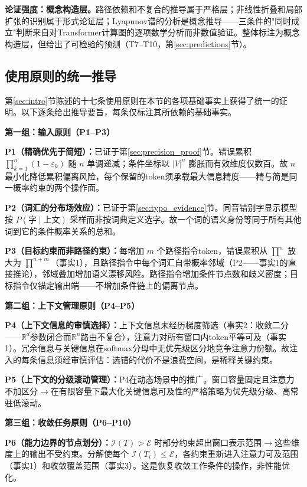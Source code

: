 \documentclass[11pt,a4paper]{article}
\theoremstyle{definition}
\newcommand{\effcap}{\mathcal{E}}
\begin{document}
\textbf{论证强度：概念构造层。}路径依赖和不复合的推导属于严格层；非线性折叠和局部扩张的识别属于形式论证层；Lyapunov谱的分析是概念推导——三条件的"同时成立"判断来自对Transformer计算图的逐项数学分析而非数值验证。整体标注为概念构造层，但给出了可检验的预测（T7--T10，第\ref{sec:predictions}节）。

\subsection{使用原则的统一推导}
\label{sec:principles_derivation}

第\ref{sec:intro}节陈述的十七条使用原则在本节的各项基础事实上获得了统一的证明。以下逐条给出推导要旨，每条仅标注其所依赖的基础事实。

\medskip
\textbf{第一组：输入原则（P1--P3）}

\textbf{P1（精确优先于简短）：}已证于第\ref{sec:precision_proof}节。错误累积 $\prod_{k=1}^n (1-\varepsilon_k)$ 随 $n$ 单调递减；条件坐标以 $|V|^n$ 膨胀而有效维度仅数百。故 $n$ 最小化降低累积偏离风险，每个保留的token须承载最大信息精度——精与简是同一概率约束的两个操作面。

\textbf{P2（词汇的分布场效应）：}已证于第\ref{sec:typo_evidence}节。同音错别字显示模型按 $P(\text{字} \mid \text{上文})$ 采样而非按词典定义选字。故一个词的语义身份等同于所有其他词到它的条件概率关系的总和。

\textbf{P3（目标约束而非路径约束）：}每增加 $m$ 个路径指令token，错误累积从 $\prod^n$ 放大为 $\prod^{n+m}$（事实1），且路径指令中每个词汇自带概率邻域（P2——事实1的直接推论），邻域叠加增加语义漂移风险。路径指令增加条件节点数和歧义密度；目标指令仅锚定输出端——不增加条件链上的偏离节点。

\medskip
\textbf{第二组：上下文管理原则（P4--P5）}

\textbf{P4（上下文信息的审慎选择）：}上下文信息未经历梯度筛选（事实2：收敛二分——$\mathbb{R}^d$参数闭合而$\mathbb{R}^n$路由不复合），注意力对所有窗口内token平等可及（事实1）。冗余信息与关键信息在softmax分母中无优先级区分地竞争注意力份额。故注入的每条信息须经审慎评估：选错的代价不是浪费空间，是稀释关键约束。

\textbf{P5（上下文的分级滚动管理）：}P4在动态场景中的推广。窗口容量固定且注意力不加区分$\to$在有限容量下最大化关键信息可及性的严格策略为优先级分级、高常驻低滚动。

\medskip
\textbf{第三组：收敛任务原则（P6--P10）}

\textbf{P6（能力边界的节点划分）：}$\mathcal{I}(T) > \effcap$ 时部分约束超出窗口表示范围$\to$这些维度上的输出不受约束。分解使每个 $\mathcal{I}(T_i) \leq \effcap$，各约束重新进入注意力可及范围（事实1）和收敛覆盖范围（事实3）。这是恢复收敛工作条件的操作，非性能优化。
\end{document}
